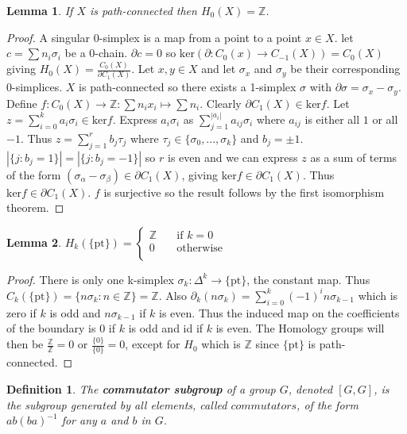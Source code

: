 \documentclass{report}
\newtheorem{definition}{Definition}
\newtheorem{lemma}{Lemma}
\begin{document}
\begin{lemma}
If $X$ is path-connected then $H_0(X)=\mathbb{Z}$.
\end{lemma}
\begin{proof}
A singular 0-simplex is a map from a point to a point $x\in X$. let $c=\sum n_i\sigma_i$ be a 0-chain. $\partial c=0$ so $\text{ker}(\partial:C_{0}(x)\rightarrow C_{-1}(X))=C_0(X)$ giving $H_0(X)=\frac{C_0(X)}{\partial C_1(X)}$. Let $x,y\in X$ and let $\sigma_x$ and $\sigma_y$ be their corresponding 0-simplices. $X$ is path-connected so there exists a 1-simplex $\sigma$ with $\partial\sigma=\sigma_x-\sigma_y$. Define $f\colon C_0(X)\to\mathbb{Z}:\sum n_ix_i\mapsto\sum n_i$. Clearly $\partial C_1(X)\in \text{ker}f$. Let $z=\sum_{i=0}^ka_i\sigma_i\in\text{ker}f$. Express $a_i\sigma_i$ as $\sum_{j=1}^{|a_i|}a_{ij}\sigma_i$ where $a_{ij}$ is either all $1$ or all $-1$. Thus $z=\sum_{j=1}^rb_j\tau_j$ where $\tau_j\in\{\sigma_0,...,\sigma_k\}$ and $b_j=\pm1$. $|\{j:b_j=1\}|=|\{j:b_j=-1\}|$ so $r$ is even and we can express $z$ as a sum of terms of the form $(\sigma_\alpha - \sigma_\beta)\in\partial C_1(X)$, giving $\text{ker}f\in\partial C_1(X)$. Thus $\text{ker}f\in\partial C_1(X)$. $f$ is surjective so the result follows by the first isomorphism theorem.
\end{proof}

\begin{lemma}
$H_k(\{\text{pt}\})=\begin{cases}
       \mathbb{Z} &\quad\text{if }k=0 \\
       0 &\quad\text{otherwise} \\ 
     \end{cases}$
\end{lemma}
\begin{proof}
There is only one k-simplex $\sigma_k\colon\Delta^k\rightarrow \{\text{pt}\}$, the constant map. Thus $C_k(\{\text{pt}\})=\{n\sigma_k:n\in\mathbb{Z}\}=\mathbb{Z}$.
Also $\partial_k(n\sigma_k)=\sum_{i=0}^k(-1)^i n\sigma_{k-1}$ which is zero if $k$ is odd and $n\sigma_{k-1}$ if $k$ is even. Thus the induced map on the coefficients of the boundary is $0$ if $k$ is odd and id if $k$ is even. The Homology groups will then be $\frac{\mathbb{Z}}{\mathbb{Z}}=0$ or $\frac{\{0\}}{\{0\}}=0$, except for $H_0$ which is $\mathbb{Z}$ since $\{\text{pt}\}$ is path-connected.
\end{proof}


\begin{definition}
The \textbf{commutator subgroup} of a group $G$, denoted $[G,G]$, is the subgroup generated by all elements, called $commutators$, of the form $ab(ba)^{-1}$ for any $a$ and $b$ in $G$.
\end{definition}
\end{document}
